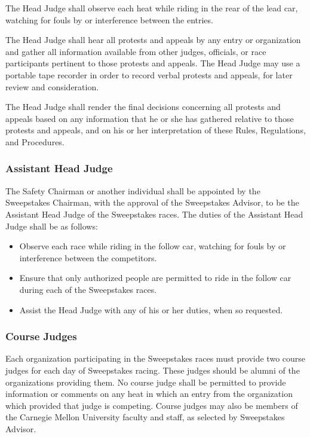 	The Head Judge shall observe each heat while riding in the rear of the lead
	car, watching for fouls by or interference between the entries.

	The Head Judge shall hear all protests and appeals by any entry or organization
	and gather all information available from other judges, officials, or race
	participants pertinent to those protests and appeals. The Head Judge may use a
	portable tape recorder in order to record verbal protests and appeals, for
	later review and consideration.

	The Head Judge shall render the final decisions concerning all protests and
	appeals based on any information that he or she has gathered relative to those
	protests and appeals, and on his or her interpretation of these Rules,
	Regulations, and Procedures.
	

\subsubsection{Assistant Head Judge}

	The Safety Chairman or another individual shall be appointed by the Sweepstakes 
	Chairman, with the approval of the Sweepstakes Advisor, to be the Assistant Head
	Judge of the Sweepstakes races. The duties of the Assistant Head Judge shall be 
	as follows:

	\begin{itemize}

		\item Observe each race while riding in the follow car, watching for fouls 
		by or interference between the competitors.

		\item Ensure that only authorized people are permitted to ride in the follow 
		car during each of the Sweepstakes races.

		\item Assist the Head Judge with any of his or her duties, when so requested.

	\end{itemize}

\subsubsection{Course Judges}

	Each organization participating in the Sweepstakes races must provide two
	course judges for each day of Sweepstakes racing. These judges should be 
	alumni of the organizations providing them. No course judge shall be 
	permitted to provide information or comments on any heat in which an 
	entry from the organization which provided that judge is competing. 
	Course judges may also be members of the Carnegie Mellon University 
	faculty and staff, as selected by Sweepstakes Advisor.
	
